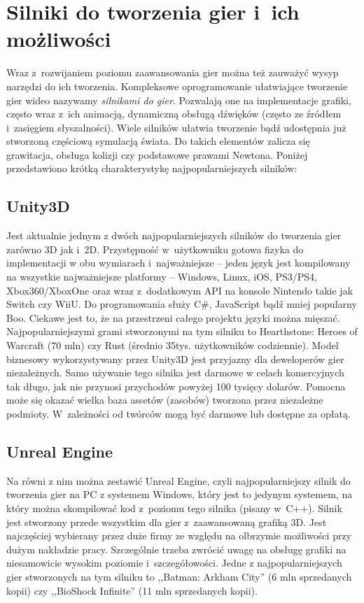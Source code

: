\documentclass[brudnopis]{xmgr}
\begin{document}
\section{Silniki do tworzenia gier i~ich możliwości\label{s:edytor}}
Wraz z~rozwijaniem poziomu zaawansowania gier można też zauważyć wysyp
narzędzi do ich tworzenia. Kompleksowe oprogramowanie ułatwiające
tworzenie gier wideo nazywamy {\em silnikami do gier}. Pozwalają one na
implementacje grafiki, często wraz z~ich animacją, dynamiczną obsługą
dźwięków (często ze źródłem i~zasięgiem słyszalności). Wiele silników ułatwia tworzenie bądź udostępnia już stworzoną częściową symulacją świata. Do takich elementów zalicza się grawitacja, obsługa kolizji czy podstawowe prawami Newtona. Poniżej przedstawiono krótką charakterystykę najpopularniejszych silników:

\subsection*{Unity3D}
Jest aktualnie jednym z dwóch najpopularniejszych silników do tworzenia gier zarówno 3D jak i~2D. Przystępność w~użytkowniku gotowa fizyka do implementacji w
obu wymiarach i~najważniejsze -- jeden język jest kompilowany na wszystkie
najważniejsze platformy -- Windows, Linux, iOS, PS3/PS4, Xbox360/XboxOne
oraz wraz z~dodatkowym API na konsole Nintendo takie jak Switch czy WiiU.
Do programowania służy C\#, JavaScript bądź mniej popularny Boo.
Ciekawe jest to, że na przestrzeni całego projektu języki można mięszać.
Najpopularniejszymi grami stworzonymi na tym silniku to Hearthstone:
Heroes of Warcraft (70 mln) czy Rust (średnio 35tys. użytkowników codziennie).
Model biznesowy wykorzystywany przez Unity3D jest przyjazny dla
deweloperów gier niezależnych. Samo używanie tego silnika jest darmowe w
celach komercyjnych tak długo, jak nie przynosi przychodów powyżej 100
tysięcy dolarów. Pomocna może się okazać wielka baza assetów (zasobów)
tworzona przez niezależne podmioty. W~zależności od twórców mogą być
darmowe lub dostępne za opłatą.

\subsection*{Unreal Engine}
Na równi z nim można zestawić Unreal Engine, czyli najpopularniejszy silnik do tworzenia gier na PC z
systemem Windows, który jest to jedynym systemem, na który można
skompilować kod z~poziomu tego silnika (pisany w~C++). Silnik jest
stworzony przede wszystkim dla gier z~zaawansowaną grafiką 3D. Jest
najczęściej wybierany przez duże firmy ze względu na olbrzymie możliwości przy
dużym nakładzie pracy. Szczególnie trzeba zwrócić uwagę na obsługę
grafiki na niesamowicie wysokim poziomie i~szczegółowości. Jedne z
najpopularniejszych gier stworzonych na tym silniku to ,,Batman: Arkham
City'' (6 mln sprzedanych kopii) czy ,,BioShock Infinite'' (11 mln
sprzedanych kopii).
\end{document}
